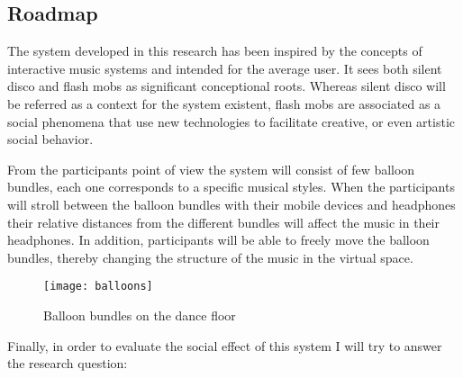 \subsection{Roadmap}\label{roadmap}


The system developed in this research has been inspired by the concepts of interactive music systems and intended for the average user. It sees both silent disco and flash mobs as significant conceptional roots. Whereas silent disco will be referred as a context for the system existent, flash mobs are associated as a social phenomena that use new technologies to facilitate creative, or even artistic social behavior.

From the participants point of view the system will consist of few balloon bundles, each one corresponds to a specific musical styles. When the participants will stroll between the balloon bundles with their mobile devices and headphones their relative distances from the different bundles will affect the music in their headphones. In addition, participants will be able to freely move the balloon bundles, thereby changing the structure of the music in the virtual space.

\begin{figure}[h]
	\texttt{[image: balloons]}
	\caption{Balloon bundles on the dance floor}
\end{figure}

Finally, in order to evaluate the social effect of this system I will try to answer the research question: \emph{\reserchquestion}